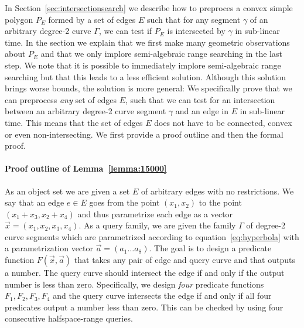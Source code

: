 \documentclass[UKenglish]{lipics-v2019}
\begin{document}
In Section~\ref{sec:intersectionsearch} we describe how to preproces a convex simple polygon $P_E$ formed by a set of edges $E$ such that for any segment $\gamma$ of an arbitrary degree-2 curve $\Gamma$, we can test if $P_E$ is intersected by $\gamma$ in sub-linear time. In the section we explain that we first make many geometric observations about $P_E$ and that we only implore semi-algebraic range searching in the last step. We note that it is possible to immediately implore semi-algebraic range searching but that this leads to a less efficient solution. Although this solution brings worse bounds, the solution is more general: We specifically prove that we can preprocess \emph{any} set of edges $E$, such that we can test for an intersection between an arbitrary degree-2 curve segment $\gamma$ and an edge in $E$ in sub-linear time.  This means that the set of edges $E$ does not have to be connected, convex or even non-intersecting. We first provide a proof outline and then the formal proof.

\paragraph*{Proof outline of Lemma~\ref{lemma:15000}}
As an object set we are given a set $E$ of arbitrary edges with no restrictions. We say that an edge $e \in E$ goes from the point $(x_1, x_2)$ to the point $(x_1 + x_3, x_2 + x_4)$ and thus parametrize each edge as a vector $\vec{x} = (x_1, x_2, x_3, x_4)$. As a query family, we are given the family $\Gamma$ of degree-2 curve segments which are parametrized according to equation~\ref{eq:hyperbola} with a parametrization vector $\vec{a} = (a_1 \ldots a_8)$. The goal is to design a predicate function $F(\vec{x}, \vec{a})$ that takes any pair of edge and query curve and that outputs a number. The query curve should intersect the edge if and only if the output number is less than zero. Specifically, we design \emph{four} predicate functions $F_1, F_2, F_3, F_4$ and the query curve intersects the edge if and only if all four predicates output a number less than zero. This can be checked by using four consecutive halfspace-range queries.
\end{document}
